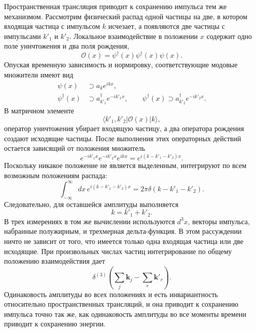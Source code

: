 Пространственная трансляция приводит к сохранению импульса тем же механизмом. Рассмотрим физический распад одной частицы на две, в котором входящая частица с импульсом \(k\) исчезает, а появляются две частицы с импульсами \(k'_1\) и \(k'_2\). Локальное взаимодействие в положении \(x\) содержит одно поле уничтожения и два поля рождения,
\begin{equation}
\mathcal{O}(x)=\psi^\dagger(x)\psi^\dagger(x)\psi(x).
\end{equation}
Опуская временную зависимость и нормировку, соответствующие модовые множители имеют вид
\begin{align}
\psi(x)&\supset a_k e^{ikx},
\\
\psi^\dagger(x)&\supset a_{k'_1}^\dagger e^{-ik'_1x},
\qquad
\psi^\dagger(x)\supset a_{k'_2}^\dagger e^{-ik'_2x}.
\end{align}
В матричном элементе
\begin{equation}
\langle k'_1,k'_2|\mathcal{O}(x)|k\rangle,
\end{equation}
оператор уничтожения убирает входящую частицу, а два оператора рождения создают исходящие частицы. После выполнения этих операторных действий остается зависящий от положения множитель
\begin{equation}
e^{-ik'_1x}e^{-ik'_2x}e^{ikx}
=e^{i(k-k'_1-k'_2)x}.
\end{equation}
Поскольку никакое положение не является выделенным, интегрируют по всем возможным положениям распада:
\begin{equation}
\int_{-\infty}^{\infty}dx\,
e^{i(k-k'_1-k'_2)x}
=2\pi\delta(k-k'_1-k'_2).
\end{equation}
Следовательно, для оставшейся амплитуды выполняется
\begin{equation}
k=k'_1+k'_2.
\end{equation}
В трех измерениях в том же вычислении используются \(d^3x\), векторы импульса, набранные полужирным, и трехмерная дельта-функция. В этом рассуждении ничто не зависит от того, что имеется только одна входящая частица или две исходящие. При произвольных числах частиц интегрирование по общему положению взаимодействия дает
\begin{equation}
\delta^{(3)}\!\left(
\sum_j\mathbf{k}_j-\sum_r\mathbf{k}'_r
\right).
\end{equation}
Одинаковость амплитуды во всех положениях и есть инвариантность относительно пространственных трансляций, и она приводит к сохранению импульса точно так же, как одинаковость амплитуды во все моменты времени приводит к сохранению энергии.

